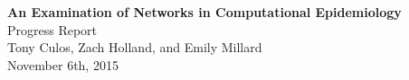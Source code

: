 \begin{titlepage}
\begin{center}
\vspace*{150px}
\LARGE{\textbf{An Examination of Networks in Computational Epidemiology} \\}
\vspace{12px}
\Large{Progress Report\\}
\vspace{12px}
\large{Tony Culos, Zach Holland, and Emily Millard \\}
\vspace{12px}
\large{November 6th, 2015 \\}
\end{center}
\end{titlepage}